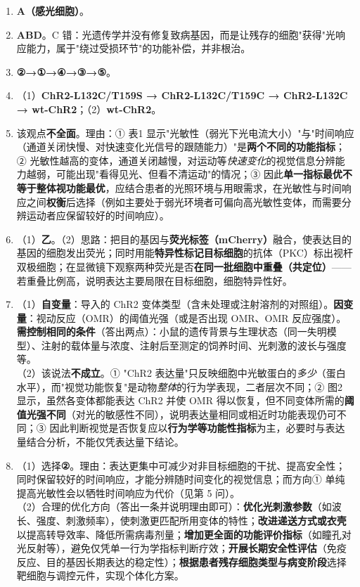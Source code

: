 \documentclass[UTF8,a4paper,11pt]{ctexart}
\begin{document}
\begin{enumerate}[leftmargin=2.1em,itemsep=4pt]
\item \textbf{A（感光细胞）}。
\item \textbf{ABD}。C 错：光遗传学并没有修复致病基因，而是让残存的细胞"获得"光响应能力，属于"绕过受损环节"的功能补偿，并非根治。
\item \textbf{②→①→④→③→⑤}。
\item （1）\textbf{ChR2-L132C/T159S → ChR2-L132C/T159C → ChR2-L132C → wt-ChR2}；（2）\textbf{wt-ChR2}。
\item 该观点\textbf{不全面}。理由：① 表1 显示"光敏性（弱光下光电流大小）"与"时间响应（通道关闭快慢、对快速变化光信号的跟随能力）"是\textbf{两个不同的功能指标}；② 光敏性越高的变体，通道关闭越慢，对运动等\emph{快速变化}的视觉信息分辨能力越弱，可能出现"看得见光、但看不清运动"的情况；③ 因此\textbf{单一指标最优不等于整体视功能最优}，应结合患者的光照环境与用眼需求，在光敏性与时间响应之间\textbf{权衡}后选择（例如主要处于弱光环境者可偏向高光敏性变体，而需要分辨运动者应保留较好的时间响应）。
\item （1）\textbf{乙}。（2）思路：把目的基因与\textbf{荧光标签（mCherry）}融合，使表达目的基因的细胞发出荧光；同时用能\textbf{特异性标记目标细胞}的抗体（PKC）标出视杆双极细胞；在显微镜下观察两种荧光是否\textbf{在同一批细胞中重叠（共定位）}——若重叠比例高，说明表达主要局限在目标细胞，细胞特异性好。
\item （1）\textbf{自变量}：导入的 ChR2 变体类型（含未处理或注射溶剂的对照组）。\textbf{因变量}：视动反应（OMR）的阈值光强（或是否出现 OMR、OMR 反应强度）。\textbf{需控制相同的条件}（答出两点）：小鼠的遗传背景与生理状态（同一失明模型）、注射的载体量与浓度、注射后至测定的饲养时间、光刺激的波长与强度等。\\
（2）该说法\textbf{不成立}。① "ChR2 表达量"只反映细胞中光敏蛋白的\emph{多少}（蛋白水平），而"视觉功能恢复"是动物\emph{整体}的行为学表现，二者层次不同；② 图2 显示，虽然各变体都能表达 ChR2 并使 OMR 得以恢复，但不同变体所需的\textbf{阈值光强不同}（对光的敏感性不同），说明表达量相同或相近时功能表现仍可不同；③ 因此判断视觉是否恢复应以\textbf{行为学等功能性指标}为主，必要时与表达量结合分析，不能仅凭表达量下结论。
\item （1）选择\textbf{②}。理由：表达更集中可减少对非目标细胞的干扰、提高安全性；同时保留较好的时间响应，才能分辨随时间变化的视觉信息；而方向① 单纯提高光敏性会以牺牲时间响应为代价（见第 5 问）。\\
（2）合理的优化方向（答出一条并说明理由即可）：\textbf{优化光刺激参数}（如波长、强度、刺激频率），使刺激更匹配所用变体的特性；\textbf{改进递送方式或衣壳}以提高转导效率、降低所需病毒剂量；\textbf{增加更全面的功能评价指标}（如瞳孔对光反射等），避免仅凭单一行为学指标判断疗效；\textbf{开展长期安全性评估}（免疫反应、目的基因长期表达的稳定性）；\textbf{根据患者残存细胞类型与病变阶段}选择靶细胞与调控元件，实现个体化方案。
\end{enumerate}
\end{document}
